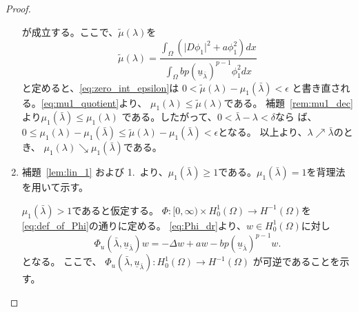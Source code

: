 \begin{proof}
\begin{enumerate}[1.]
        が成立する。ここで、$\tilde{\mu}(\lambda)$を
        \[
         \tilde{\mu}(\lambda) = 
        \frac{\displaystyle \int_\Omega \left( \lvert D\phi_1
                                              \rvert^2
                                              + a
                                             \phi_1^2\right) dx}
         {\displaystyle 
         \int_\Omega bp (\underline{u}_{\bar{\lambda}})^{p-1} \phi_1^2 dx}
        \]
        と定めると、\eqref{eq:zero_int_epsilon}は
        $0 < \tilde{\mu}(\lambda) - \mu_1(\bar{\lambda}) < \epsilon$
        と書き直される。\eqref{eq:mu1_quotient}より、
        $\mu_1(\lambda) \leq \tilde{\mu}(\lambda)$である。
        補題~\ref{rem:mu1_dec}より$\mu_1(\bar{\lambda}) \leq
        \mu_1(\lambda)$
        である。したがって、$0 < \bar{\lambda} - \lambda < \delta$なら
        ば、$0 \leq \mu_1 (\lambda) - \mu_1 (\bar{\lambda}) \leq
        \tilde{\mu}(\lambda) - \mu_1 (\bar{\lambda}) < \epsilon$となる。
        以上より、$\lambda \nearrow \bar{\lambda}$のとき、
        $\mu_1(\lambda) \searrow \mu_1(\bar{\lambda})$である。
  \item 補題~\ref{lem:lin_1} および 1.~より、$\mu_1(\bar{\lambda})
        \geq 1$である。$\mu_1(\bar{\lambda}) = 1$を背理法を用いて示す。
        
        $\mu_1(\bar{\lambda}) > 1$であると仮定する。
        $\Phi \colon [0,\infty) \times H^1_0 (\Omega) \to
        H^{-1}(\Omega)$を
        \eqref{eq:def_of_Phi}の通りに定める。
        \eqref{eq:Phi_dr}より、$w \in H^1_0(\Omega)$に対し
        \begin{equation}
         \Phi_u (\bar{\lambda}, \underline{u}_{\bar{\lambda}})
          w = -\Delta w + aw - b
          p(\underline{u}_{\bar{\lambda}})^{p-1} w.
          \label{eq:Phi_dr_barlambda}
        \end{equation}
        となる。
        ここで、
        $\Phi_u (\bar{\lambda}, \underline{u}_{\bar{\lambda}}) \colon
        H_0^1(\Omega) \to H^{-1}(\Omega)$
        が可逆であることを示す。


\end{enumerate}
\end{proof}
